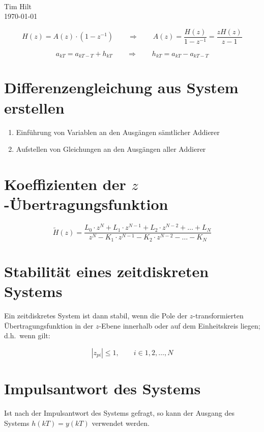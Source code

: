 \documentclass[10pt,a5paper]{scrartcl}
\begin{document}
\sffamily
{\\[1ex]
  Tim Hilt\\
  \today
  \par}

\vfill

\tableofcontents
\clearpage

\[H(z) = A(z) \cdot (1 - z^{-1}) \qquad\Rightarrow\qquad A(z) = \frac{H(z)}{1 - z^{-1}} = \frac{zH(z)}{z-1}\]

\[a_{kT} = a_{kT - T} + h_{kT} \qquad\Rightarrow\qquad h_{kT} = a_{kT} - a_{kT - T}\]

\section{Differenzengleichung aus System erstellen}

\begin{enumerate}
\item Einführung von Variablen an den Ausgängen sämtlicher Addierer
\item Aufstellen von Gleichungen an den Ausgängen aller Addierer
\end{enumerate}

\section{Koeffizienten der $z$-Übertragungsfunktion}

\[\tilde{H}(z) = \frac{L_0 \cdot z^N + L_1 \cdot z^{N-1} + L_2 \cdot z^{N-2} + \ldots+ L_N}{z^N - K_1 \cdot z^{N-1} - K_2\cdot z^{N-2} - \ldots - K_N}\]

\section{Stabilität eines zeitdiskreten Systems}

Ein zeitdiskretes System ist dann stabil, wenn die Pole der \(z\)-transformierten Übertragungsfunktion in der \(z\)-Ebene innerhalb oder auf dem Einheitskreis liegen; d.h.\ wenn gilt:

\[|z_{pi}| \leq 1, \qquad i \in 1, 2, \ldots , N\]

\section{Impulsantwort des Systems}

Ist nach der Impulsantwort des Systems gefragt, so kann der Ausgang des Systems \(h(kT) = y(kT)\) verwendet werden.
\end{document}
